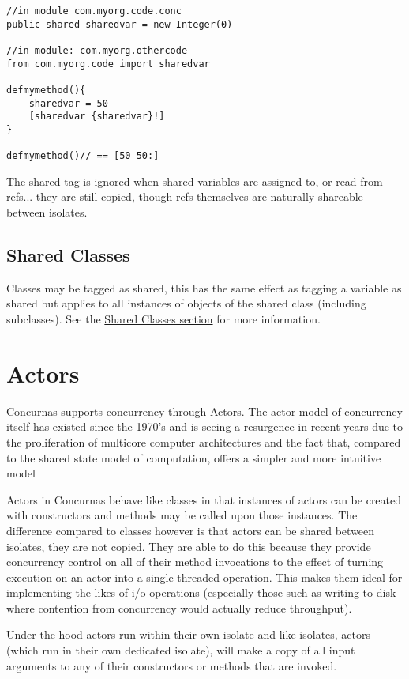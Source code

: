 \documentclass[conc-doc]{subfiles}
\begin{document}
\begin{lstlisting}
//in module com.myorg.code.conc
public shared sharedvar = new Integer(0)

//in module: com.myorg.othercode
from com.myorg.code import sharedvar

defmymethod(){
	sharedvar = 50
	[sharedvar {sharedvar}!]
}

defmymethod()// == [50 50:]
\end{lstlisting}

The shared tag is ignored when shared variables are assigned to, or read from refs... they are still copied, though refs themselves are naturally shareable between isolates.

\subsection{Shared Classes}
Classes may be tagged as shared, this has the same effect as tagging a variable as shared but applies to all instances of objects of the shared class (including subclasses). See the \hyperref[sec:sharedClasses]{Shared Classes section} for more information.

\section{Actors}
\label{sec:actors}
Concurnas supports concurrency through Actors. The actor model of concurrency itself has existed since the 1970's and is seeing a resurgence in recent years due to the proliferation of multicore computer architectures and the fact that, compared to the shared state model of computation, offers a simpler and more intuitive model

Actors in Concurnas behave like classes in that instances of actors can be created with constructors and methods may be called upon those instances. The difference compared to classes however is that actors can be shared between isolates, they are not copied. They are able to do this because they provide concurrency control on all of their method invocations to the effect of turning execution on an actor into a single threaded operation. This makes them ideal for implementing the likes of i/o operations (especially those such as writing to disk where contention from concurrency would actually reduce throughput).

Under the hood actors run within their own isolate and like isolates, actors (which run in their own dedicated isolate), will make a copy of all input arguments to any of their constructors or methods that are invoked. 
\end{document}
